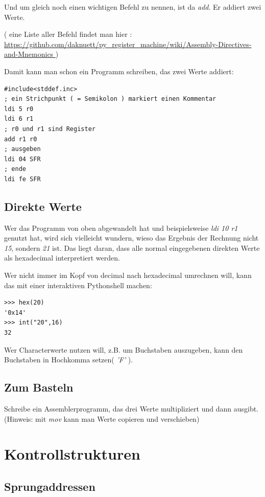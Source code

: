 \documentclass[a4paper,12pt,oneside]{scrreprt}
\begin{document}
Und um gleich noch einen wichtigen Befehl zu nennen, ist da \textit{add}. Er addiert zwei Werte.

( eine Liste aller Befehl findet man hier : \url{https://github.com/daknuett/py_register_machine/wiki/Assembly-Directives-and-Mnemonics } )

Damit kann man schon ein Programm schreiben, das zwei Werte addiert:

\begin{lstlisting}[frame=single]
#include<stddef.inc>
; ein Strichpunkt ( = Semikolon ) markiert einen Kommentar
ldi 5 r0
ldi 6 r1
; r0 und r1 sind Register
add r1 r0
; ausgeben
ldi 04 SFR
; ende
ldi fe SFR
\end{lstlisting}

\section{Direkte Werte}

Wer das Programm von oben abgewandelt hat und beispielsweise \textit{ldi 10 r1} genutzt hat, wird sich vielleicht wundern, wieso das Ergebnis der Rechnung nicht \textit{15}, sondern \textit{21} ist. Das liegt daran, dass alle normal eingegebenen direkten Werte als hexadecimal interpretiert werden.

Wer nicht immer im Kopf von decimal nach hexadecimal umrechnen will, kann das mit einer interaktiven Pythonshell machen:

\begin{lstlisting}
>>> hex(20)
'0x14'
>>> int("20",16)
32
\end{lstlisting}

Wer Characterwerte nutzen will, z.B. um Buchstaben auszugeben, kann den Buchstaben in Hochkomma setzen( \textit{'F'} ).

\section{Zum Basteln}

Schreibe ein Assemblerprogramm, das drei Werte multipliziert und dann ausgibt.   
(Hinweis: mit \textit{mov} kann man Werte copieren und verschieben)

\chapter{Kontrollstrukturen}

\section{Sprungaddressen}
\end{document}
